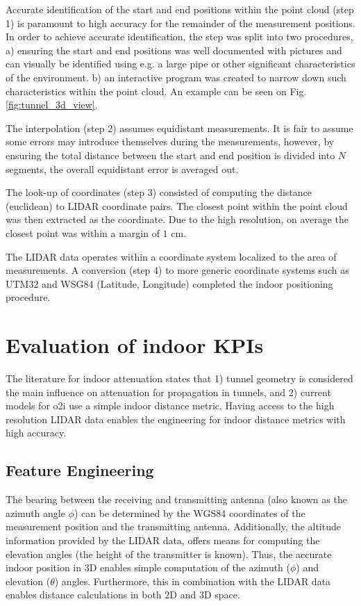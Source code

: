 Accurate identification of the start and end positions within the point cloud (step 1) is paramount to high accuracy for the remainder of the measurement positions. In order to achieve accurate identification, the step was split into two procedures, a) ensuring the start and end positions was well documented with pictures and can visually be identified using e.g. a large pipe or other significant characteristics of the environment. b) an interactive program was created to narrow down such characteristics within the point cloud. An example can be seen on Fig. \ref{fig:tunnel_3d_view}. 

The interpolation (step 2) assumes equidistant measurements. It is fair to assume some errors may introduce themselves during the measurements, however, by ensuring the total distance between the start and end position is divided into $N$ segments, the overall equidistant error is averaged out.

The look-up of coordinates (step 3) consisted of computing the distance (euclidean) to LIDAR coordinate pairs. The closest point within the point cloud was then extracted as the coordinate. Due to the high resolution, on average the closest point was within a margin of $1$ cm.

The LIDAR data operates within a coordinate system localized to the area of measurements. A conversion (step 4)  to more generic coordinate systems such as UTM32 and WSG84 (Latitude, Longitude) \cite{alan_d_snow_2020_3714221} completed the indoor positioning procedure. 


\section{Evaluation of indoor KPIs}
The literature for indoor attenuation states that 1) tunnel geometry is considered the main influence on attenuation for propagation in tunnels, and 2) current models for \gls{o2i} use a simple indoor distance metric. Having access to the high resolution LIDAR data enables the engineering for indoor distance metrics with high accuracy. 


\subsection{Feature Engineering}
The bearing between the receiving and transmitting antenna (also known as the azimuth angle $\phi$) can be determined by the WGS$84$ coordinates of the measurement position and the transmitting antenna. Additionally, the altitude information provided by the LIDAR data, offers means for computing the elevation angles (the height of the transmitter is known). Thus, the accurate indoor position in $3$D enables simple computation of the azimuth ($\phi$) and elevation ($\theta$) angles. Furthermore, this in combination with the LIDAR data enables distance calculations in both $2$D and $3$D space. 


